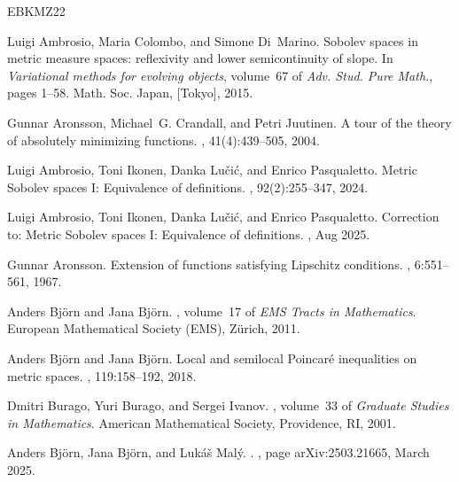 \documentclass[reqno]{amsart}
\numberwithin{equation}{section}
\theoremstyle{remark}
\begin{document}
\newcommand{\etalchar}[1]{$^{#1}$}
\begin{thebibliography}{EBKMZ22}

Luigi Ambrosio, Maria Colombo, and Simone Di~Marino.
\newblock Sobolev spaces in metric measure spaces: reflexivity and lower
  semicontinuity of slope.
\newblock In {\em Variational methods for evolving objects}, volume~67 of {\em
  Adv. Stud. Pure Math.}, pages 1--58. Math. Soc. Japan, [Tokyo], 2015.

Gunnar Aronsson, Michael~G. Crandall, and Petri Juutinen.
\newblock A tour of the theory of absolutely minimizing functions.
, 41(4):439--505, 2004.

Luigi Ambrosio, Toni Ikonen, Danka {Lu{\v{c}}i{\'c}}, and Enrico Pasqualetto.
\newblock Metric {S}obolev spaces {I}: {E}quivalence of definitions.
, 92(2):255--347, 2024.

Luigi Ambrosio, Toni Ikonen, Danka Lu{\v{c}}i{\'{c}}, and Enrico Pasqualetto.
\newblock Correction to: Metric {S}obolev spaces {I}: Equivalence of
  definitions.
, Aug 2025.

Gunnar Aronsson.
\newblock Extension of functions satisfying {L}ipschitz conditions.
, 6:551--561, 1967.

Anders Björn and Jana Björn.
, volume~17 of {\em
  EMS Tracts in Mathematics}.
\newblock European Mathematical Society (EMS), Z\"urich, 2011.

Anders Björn and Jana Björn.
\newblock Local and semilocal {P}oincar\'{e} inequalities on metric spaces.
, 119:158--192, 2018.

Dmitri Burago, Yuri Burago, and Sergei Ivanov.
, volume~33 of {\em Graduate Studies
  in Mathematics}.
\newblock American Mathematical Society, Providence, RI, 2001.

Anders Björn, Jana Björn, and Lukáš Malý.
.
, page arXiv:2503.21665, March 2025.


\end{thebibliography}
\end{document}
